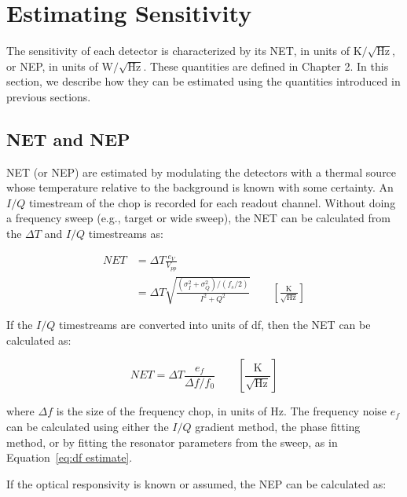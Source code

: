 \section{Estimating Sensitivity}\label{sensitivity}

The sensitivity of each detector is characterized by its NET, in units of $\mathrm{K}/\sqrt{\mathrm{Hz}}$, or NEP, in units of $\mathrm{W}/\sqrt{\mathrm{Hz}}$. These quantities are defined in Chapter 2. In this section, we describe how they can be estimated using the quantities introduced in previous sections.

\subsection{NET and NEP}\label{NET}

NET (or NEP) are estimated by modulating the detectors with a thermal source whose temperature relative to the background is known with some certainty. An $I/Q$ timestream of the chop is recorded for each readout channel. Without doing a frequency sweep (e.g., target or wide sweep), the NET can be calculated from the $\Delta T$ and $I/Q$ timestreams as:

\begin{equation}
  \begin{aligned}
  NET &= \Delta T \frac{e_{V}}{V_{pp}} \\
      &= \Delta T \sqrt{ \frac{ (\sigma^{2}_{I} + \sigma^{2}_{Q}) / (f_{s}/2)}{ I^{2} + Q^{2} } }  \qquad \left[ \frac{ \mathrm{K} }{ \sqrt{\mathrm{Hz}} } \right]
  \end{aligned}
\end{equation}

If the $I/Q$ timestreams are converted into units of \gls{df}, then the NET can be calculated as:

\begin{equation}\label{eq:NET freq}
  NET = \Delta T \frac{e_{f}}{\Delta f/f_{0}} \qquad \left[ \frac{\mathrm{K}}{ \sqrt{\mathrm{Hz}} } \right]
\end{equation}

where $\Delta f$ is the size of the frequency chop, in units of Hz. The frequency noise $e_{f}$ can be calculated using either the $I/Q$ gradient method, the phase fitting method, or by fitting the resonator parameters from the sweep, as in Equation~\ref{eq:df estimate}.

If the optical responsivity is known or assumed, the NEP can be calculated as:

